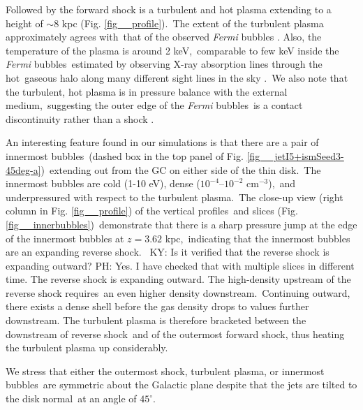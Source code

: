\documentclass[fleqn,usenatbib,useAMS]{mnras}
\begin{document}
 Followed by the forward shock is a turbulent and hot plasma extending to a height of $\sim 8$ kpc (Fig. \ref{fig__profile}).\
 The extent of the turbulent plasma approximately agrees with\
 that of the observed \textit{Fermi} bubbles \citep{Su2010}.
 Also, the temperature of the plasma is around 2 keV,\
 comparable to few keV inside the \textit{Fermi} bubbles\
 estimated by observing X-ray absorption lines through the hot\
 gaseous halo along many different sight lines in the sky \citep{Miller_2013}.\
 We also note that the turbulent, hot plasma is in pressure balance with the external medium,\
 suggesting the outer edge of the \textit{Fermi} bubbles\
 is a contact discontinuity rather than a shock \citep{Zhang2020}.


 An interesting feature found in our simulations is that there are a pair of innermost bubbles\
 (dashed box in the top panel of Fig. \ref{fig__jetI5+ismSeed3-45deg-a})\
 extending out from the GC on either side of the thin disk.\
 The innermost bubbles are cold (1-10 eV), dense ($10^{-4}$--$10^{-2}$ cm$^{-3}$),\
 and underpressured with respect to the turbulent plasma.\
 The close-up view (right column in Fig. \ref{fig__profile}) of the vertical profiles\
 and slices (Fig. \ref{fig__innerbubbles})\
 demonstrate that there is a sharp pressure jump at the edge of the innermost bubbles at $z=3.62$ kpc,\
 indicating that the innermost bubbles are an expanding reverse shock.\ {\color{red} KY: Is it verified that the reverse shock is expanding outward? PH: Yes. I have checked that with multiple slices in different time. The reverse shock is expanding outward.}
 The high-density upstream of the reverse shock requires\
 an even higher density downstream.\
 Continuing outward, there exists a dense shell before the gas density drops to values further downstream.
 The turbulent plasma is therefore bracketed between the downstream of reverse shock\
 and of the outermost forward shock, thus heating the turbulent plasma up considerably.

 We stress that either the outermost shock, turbulent plasma, or innermost bubbles\
 are symmetric about the Galactic plane despite that the jets are tilted to the disk normal\
 at an angle of $45^{\circ}$.
\end{document}

